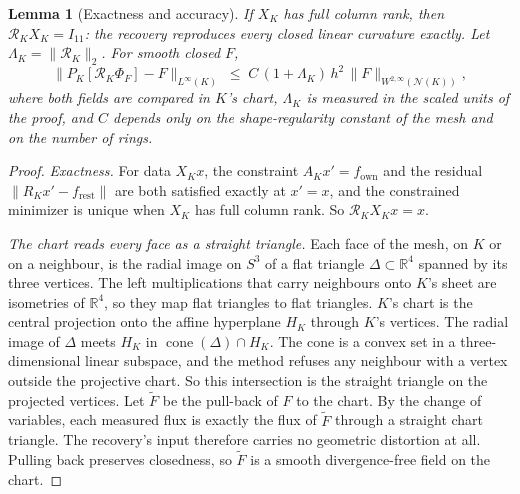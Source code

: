 \documentclass[11pt]{article}
\newtheorem{lemma}[theorem]{Lemma}
\theoremstyle{definition}
\theoremstyle{remark}
\newcommand{\RR}{\mathbb{R}}
\newcommand{\cR}{\mathcal{R}}
\newcommand{\norm}[1]{\lVert #1\rVert}
\begin{document}
\begin{lemma}[Exactness and accuracy]\label{lem:acc}
If $X_K$ has full column rank, then $\cR_KX_K=I_{11}$: the recovery reproduces every
closed linear curvature exactly. Let $\Lambda_K=\norm{\cR_K}_2$. For smooth closed $F$,
\[
  \norm{P_K[\cR_K\Phi_F]-F}_{L^\infty(K)} \;\le\; C\,(1+\Lambda_K)\,h^2\,\norm{F}_{W^{2,\infty}(\mathcal{N}(K))},
\]
where both fields are compared in $K$'s chart, $\Lambda_K$ is measured in the scaled units of the
proof, and $C$ depends only on the shape-regularity constant of the mesh and on the number of rings.
\end{lemma}
\begin{proof}
\emph{Exactness.} For data $X_Kx$, the constraint $A_Kx'=f_{\mathrm{own}}$ and the residual
$\norm{R_Kx'-f_{\mathrm{rest}}}$ are both satisfied exactly at $x'=x$, and the constrained
minimizer is unique when $X_K$ has full column rank. So $\cR_KX_Kx=x$.

\emph{The chart reads every face as a straight triangle.} Each face of the mesh, on $K$ or on a
neighbour, is the radial image on $S^3$ of a flat triangle $\Delta\subset\RR^4$ spanned by its
three vertices. The left multiplications that carry neighbours onto $K$'s sheet are isometries
of $\RR^4$, so they map flat triangles to flat triangles. $K$'s chart is the central
projection onto the affine hyperplane $H_K$ through $K$'s vertices. The radial image of
$\Delta$ meets $H_K$ in $\operatorname{cone}(\Delta)\cap H_K$. The cone is a convex set in a
three-dimensional linear subspace, and the method refuses any neighbour with a vertex outside
the projective chart. So this intersection is the straight triangle on the projected
vertices. Let $\tilde F$ be the pull-back of $F$ to the chart. By the change of variables, each
measured flux is exactly the flux of $\tilde F$ through a straight chart triangle. The
recovery's input therefore carries no geometric distortion at all. Pulling back preserves
closedness, so $\tilde F$ is a smooth divergence-free field on the chart.


\end{proof}
\end{document}
